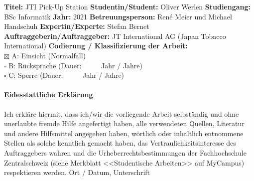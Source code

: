 	\fontsize{10.5}{12}
	\noindent
	\textbf{Titel:} JTI Pick-Up Station \newline \newline
	\textbf{Studentin/Student:} Oliver Werlen \newline \newline
	\textbf{Studiengang:} BSc Informatik \newline \newline
	\textbf{Jahr:} 2021\newline \newline
	\textbf{Betreuungsperson:} René Meier und Michael Handschuh \newline \newline
	\textbf{Expertin/Experte:} Stefan Bernet \newline \newline
	\textbf{Auftraggeberin/Auftraggeber:} JT International AG (Japan Tobacco International) \newline \newline \newline
	\textbf{Codierung / Klassifizierung der Arbeit:}\\
	$\boxtimes$ A: Einsicht 	(Normalfall) \\
	$\square$ B: R\"ucksprache	(Dauer:  \ \ \ \ \     Jahr / Jahre)\\
	$\square$ C: Sperre	(Dauer:  \ \ \ \ \     Jahr / Jahre)\\
	
	
	
	
	\paragraph{\textbf{Eidesstattliche Erkl\"arung}}
	Ich erkl\"are hiermit, dass ich/wir die vorliegende Arbeit selbst\"andig und ohne unerlaubte fremde Hilfe angefertigt haben, alle verwendeten Quellen, Literatur und andere Hilfsmittel angegeben haben, w\"ortlich oder inhaltlich entnommene Stellen als solche kenntlich gemacht haben, das Vertraulichkeitsinteresse des Auftraggebers wahren und die Urheberrechtsbestimmungen der Fachhochschule Zentralschweiz (siehe Merkblatt <<Studentische Arbeiten>> auf MyCampus) respektieren werden. \newline \newline 
	Ort / Datum, Unterschrift	\underline{\hspace*{4cm}} 
	
